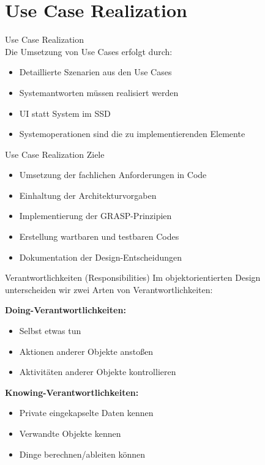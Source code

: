 \section{Use Case Realization}

\begin{concept}{Use Case Realization}\\
Die Umsetzung von Use Cases erfolgt durch:
\begin{itemize}
    \item Detaillierte Szenarien aus den Use Cases
    \item Systemantworten müssen realisiert werden
    \item UI statt System im SSD
    \item Systemoperationen sind die zu implementierenden Elemente
\end{itemize}
\end{concept}

\begin{theorem}{Use Case Realization Ziele}
\begin{itemize}
    \item Umsetzung der fachlichen Anforderungen in Code
    \item Einhaltung der Architekturvorgaben
    \item Implementierung der GRASP-Prinzipien
    \item Erstellung wartbaren und testbaren Codes
    \item Dokumentation der Design-Entscheidungen
\end{itemize}
\end{theorem}

\begin{definition}{Verantwortlichkeiten (Responsibilities)}
Im objektorientierten Design unterscheiden wir zwei Arten von Verantwortlichkeiten:

\textbf{Doing-Verantwortlichkeiten:}
\begin{itemize}
    \item Selbst etwas tun
    \item Aktionen anderer Objekte anstoßen
    \item Aktivitäten anderer Objekte kontrollieren
\end{itemize}

\textbf{Knowing-Verantwortlichkeiten:}
\begin{itemize}
    \item Private eingekapselte Daten kennen
    \item Verwandte Objekte kennen
    \item Dinge berechnen/ableiten können
\end{itemize}
\end{definition}


